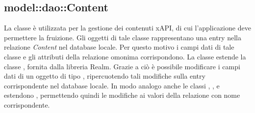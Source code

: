 \documentclass[../Tesi.tex]{subfiles}
\begin{document}
		\subsection{model::dao::Content}
		La classe  è utilizzata per la gestione dei contenuti xAPI, di cui l'applicazione deve permettere la fruizione. Gli oggetti di tale classe rappresentano una entry nella relazione \textit{Content} nel database locale. Per questo motivo i campi dati di tale classe e gli attributi della relazione omonima corrispondono. La classe  estende la classe , fornita dalla libreria Realm. Grazie a ciò è possibile modificare i campi dati di un oggetto di tipo , ripercuotendo tali modifiche sulla entry corrispondente nel database locale. In modo analogo anche le classi , ,  e  estendono , permettendo quindi le modifiche ai valori della relazione con nome corrispondente.
\end{document}
